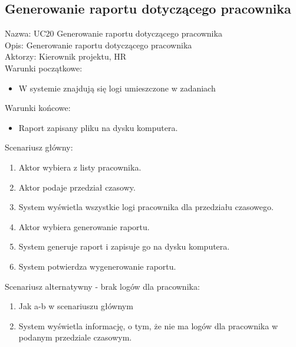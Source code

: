 \subsection{Generowanie raportu dotyczącego pracownika}
Nazwa: UC20 Generowanie raportu dotyczącego pracownika \\
Opis: Generowanie raportu dotyczącego pracownika \\
Aktorzy: Kierownik projektu, HR \\
Warunki początkowe:
\begin{itemize}
\item W systemie znajdują się logi umieszczone w zadaniach
\end{itemize}
Warunki końcowe:
\begin{itemize}
\item Raport zapisany pliku na dysku komputera.
\end{itemize}
Scenariusz główny:
\begin{enumerate}
\item Aktor wybiera z listy pracownika.
\item Aktor podaje przedział czasowy.
\item System wyświetla wszystkie logi pracownika dla przedziału czasowego.
\item Aktor wybiera generowanie raportu.
\item System generuje raport i zapisuje go na dysku komputera.
\item System potwierdza wygenerowanie raportu.
\end{enumerate}
Scenariusz alternatywny - brak logów dla pracownika: 
\begin{enumerate}
\item Jak a-b w scenariuszu głównym
\item System wyświetla informację, o tym, że nie ma logów dla pracownika w podanym przedziale czasowym.
\end{enumerate}


